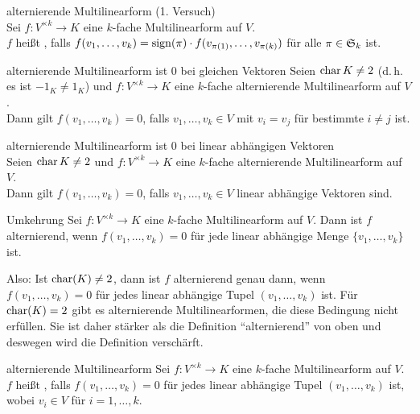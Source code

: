 \begin{Def}{alternierende Multilinearform (1. Versuch)} \\
    Sei $f: V^{\times k} \rightarrow K$ eine $k$-fache Multilinearform auf
    $V$. \\
    $f$ heißt , falls
    $f(v_1, \dotsc, v_k) = \operatorname{sign}(\pi) \cdot f(v_{\pi(1)}, \dotsc, v_{\pi(k)})$
    für alle $\pi \in \mathfrak{S}_k$ ist.
\end{Def}

\begin{Lemma}{alternierende Multilinearform ist $0$ bei gleichen Vektoren}
    Seien $\operatorname{char} K \not= 2$ (d.\,h. es ist $-1_K \not= 1_K$) und
    $f: V^{\times k} \rightarrow K$ eine $k$-fache alternierende
    Multilinearform auf $V$. \\
    Dann gilt $f(v_1, \dotsc, v_k) = 0$, falls
    $v_1, \dotsc, v_k \in V$ mit $v_i = v_j$ für bestimmte $i \not= j$ ist.
\end{Lemma}

\begin{Lemma}{alternierende Multilinearform ist $0$ bei linear abhängigen
              Vektoren} \\
    Seien $\operatorname{char} K \not= 2$ und
    $f: V^{\times k} \rightarrow K$ eine $k$-fache alternierende
    Multilinearform auf $V$. \\
    Dann gilt $f(v_1, \dotsc, v_k) = 0$, falls
    $v_1, \dotsc, v_k \in V$ linear abhängige Vektoren sind.
\end{Lemma}

\begin{Lemma}{Umkehrung}
    Sei $f: V^{\times k} \rightarrow K$ eine $k$-fache Multilinearform auf $V$.
    Dann ist $f$ alternierend, wenn
    $f(v_1, \dotsc, v_k) = 0$ für jede linear abhängige Menge
    $\{v_1, \dotsc, v_k\}$ ist.
\end{Lemma}

\begin{Bem}
    Also: Ist $\operatorname{char}(K) \not= 2$, dann ist $f$ alternierend genau dann,
    wenn $f(v_1, \dotsc, v_k) = 0$ für jedes linear abhängige Tupel
    $(v_1, \dotsc, v_k)$ ist.
    Für $\operatorname{char}(K) = 2$ gibt es alternierende Multilinearformen, die diese
    Bedingung nicht erfüllen.
    Sie ist daher stärker als die Definition "`alternierend"' von oben und
    deswegen wird die Definition verschärft.
\end{Bem}

\pagebreak

\begin{Def}{alternierende Multilinearform}
    Sei $f: V^{\times k} \rightarrow K$ eine $k$-fache Multilinearform auf
    $V$. \\
    $f$ heißt , falls $f(v_1, \dotsc, v_k) = 0$
    für jedes linear abhängige Tupel $(v_1, \dotsc, v_k)$ ist,
    wobei $v_i \in V$ für $i = 1, \dotsc, k$.
\end{Def}

